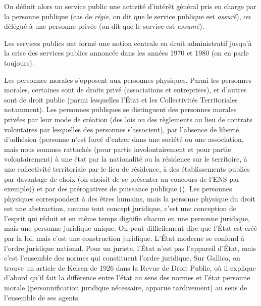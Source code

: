 \documentclass[math]{cours}
\begin{document}
On définit alors un service public une activité d'intérêt général pris en charge par la personne publique (cas de \emph{régie}, on dit que le service publique est \emph{assuré}), ou délégué à une personne privée (on dit que le service est \emph{assumé}).

Les services publics ont formé une notion centrale en droit administratif jusqu'à la crise des services publics annoncée dans les années 1970 et 1980 (on en parle toujours).

Les personnes morales s'opposent aux personnes physiques.
Parmi les personnes morales, certaines sont de droits privé (associations et entreprises), et d'autres sont de droit public (parmi lesquelles l'État et les Collectivités Territoriales notamment).
Les personnes publiques se distinguent des personnes morales privées par leur mode de création (des lois ou des règlements au lieu de contrats volontaires par lesquelles des personnes s'associent),
par l'absence de liberté d'adhésion (personne n'est forcé d'entrer dans une société ou une association, mais nous sommes rattachés (pour partie involontairement et pour partie volontairement) à une état par la nationalité ou la résidence sur le territoire, à une collectivité territoriale par le lieu de résidence, à des établissements publics par davantage de choix (on choisit de se présenter au concours de l'ENS par exemple))
et par des prérogatives de puissance publique ().
Les personnes physiques correspondent à des êtres humains, mais la personne physique du droit est une abstraction, comme tout concept juridique, c'est une conception de l'esprit qui réduit et en même temps dignifie chacun en une personne juridique, mais une personne juridique unique.
On peut difficilement dire que l'État est créé par la loi, mais c'est une construction juridique.
L'État moderne se confond à l'ordre juridique national. Pour un juriste, l'État n'est pas l'appareil d'État, mais c'est l'ensemble des normes qui constituent l'ordre juridique.
Sur Gallica, on trouve un article de Kelsen de 1926 dans la Revue de Droit Public, où il explique d'abord qu'il fait la différence entre l'état au sens des normes et l'état personne morale (personnification juridique nécessaire, apparue tardivement) au sens de l'ensemble de ses agents.
\end{document}
